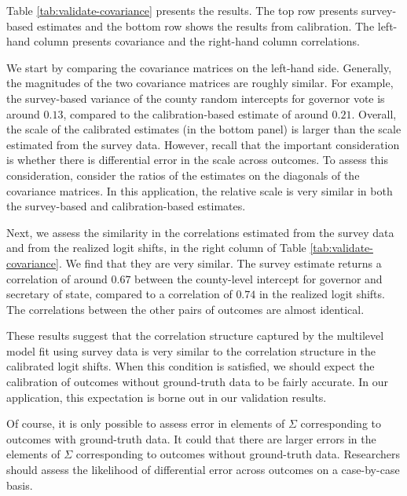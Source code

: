 Table \ref{tab:validate-covariance} presents the results. The top row presents survey-based estimates and the bottom row shows the results from calibration. The left-hand column presents covariance and the right-hand column correlations. 

We start by comparing the covariance matrices on the left-hand side. Generally, the magnitudes of the two covariance matrices are roughly similar. For example, the survey-based variance of the county random intercepts for governor vote is around $0.13$, compared to the calibration-based estimate of around $0.21$. Overall, the scale of the calibrated estimates (in the bottom panel) is larger than the scale estimated from the survey data. However, recall that the important consideration is whether there is differential error in the scale across outcomes. To assess this consideration, consider the ratios of the estimates on the diagonals of the covariance matrices. In this application, the relative scale is very similar in both the survey-based and calibration-based estimates.

Next, we assess the similarity in the correlations estimated from the survey data and from the realized logit shifts, in the right column of Table \ref{tab:validate-covariance}. We find that they are very similar. The survey estimate returns a correlation of around $0.67$ between the county-level intercept for governor and secretary of state, compared to a correlation of $0.74$ in the realized logit shifts. The correlations between the other pairs of outcomes are almost identical. 

These results suggest that the correlation structure captured by the multilevel model fit using survey data is very similar to the correlation structure in the calibrated logit shifts. When this condition is satisfied, we should expect the calibration of outcomes without ground-truth data to be fairly accurate. In our application, this expectation is borne out in our validation results. 

Of course, it is only possible to assess error in elements of $\Sigma$ corresponding to outcomes with ground-truth data. It could that there are larger errors in the elements of $\Sigma$ corresponding to outcomes without ground-truth data. Researchers should assess the likelihood of differential error across outcomes on a case-by-case basis. 




\clearpage
